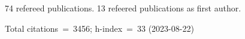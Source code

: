 74 refereed publications. 13 refeered publications as first author.

Total citations~=~3456; h-index~=~33 (2023-08-22)